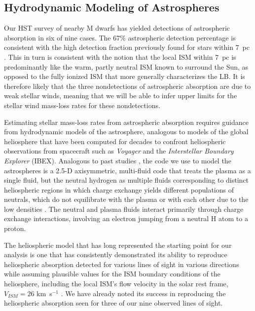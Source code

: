 \documentclass[preprint]{aastex}
\begin{document}
\subsection{Hydrodynamic Modeling of Astrospheres}

     Our HST survey of nearby M dwarfs has yielded detections
of astrospheric absorption in six of nine cases.  The
67\% astrospheric detection percentage is consistent with the
high detection fraction previously found for stars within 7~pc
\citep{bew18}.  This in turn is consistent with the notion that
the local ISM within 7~pc is predominantly like the warm, partly
neutral ISM known to surround the Sun, as opposed to the
fully ionized ISM that more generally characterizes the LB.
It is therefore likely that the three nondetections of
astrospheric absorption are due to weak stellar winds, meaning
that we will be able to infer upper limits for the stellar
wind mass-loss rates for these nondetections.

     Estimating stellar mass-loss rates from astrospheric
absorption requires guidance from hydrodynamic models of
the astrosphere, analogous to models of the global heliosphere
that have been computed for decades to confront heliospheric
observations from spacecraft such as {\em Voyager} and
the {\em Interstellar Boundary Explorer} (IBEX).
Analogous to past studies \citep{bew05a,bew14}, the
code we use to model the astrospheres is a 2.5-D axisymmetric,
multi-fluid code that treats the plasma as a single fluid,
but the neutral hydrogen as multiple fluids corresponding to
distinct heliospheric regions in which charge exchange yields
different populations of neutrals, which do not equilibrate
with the plasma or with each other due to the low
densities \citep{gpz96}.  The neutral and plasma fluids
interact primarily through charge exchange interactions,
involving an electron jumping from a neutral H atom to a proton.

     The heliospheric model that has long represented the
starting point for our analysis is one that has consistently
demonstrated its ability to reproduce heliospheric absorption
detected for various lines of sight in various directions
while assuming plausible values for the ISM boundary conditions
of the heliosphere, including the local ISM's flow velocity
in the solar rest frame, $V_{ISM}=26$ km~s$^{-1}$
\citep{bew00,bew05b}.  We have already
noted its success in reproducing the heliospheric absorption
seen for three of our nine observed lines of sight.
\end{document}
